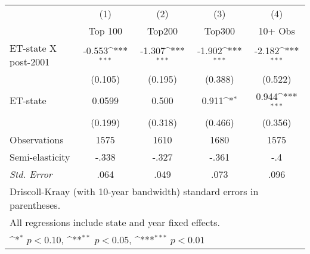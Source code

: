 {
\def\sym#1{\ifmmode^{#1}\else\(^{#1}\)\fi}
\begin{tabular}{l*{4}{c}}
\hline\hline
                &\multicolumn{1}{c}{(1)}&\multicolumn{1}{c}{(2)}&\multicolumn{1}{c}{(3)}&\multicolumn{1}{c}{(4)}\\
                &\multicolumn{1}{c}{Top 100}&\multicolumn{1}{c}{Top200}&\multicolumn{1}{c}{Top300}&\multicolumn{1}{c}{10+ Obs}\\
\hline
ET-state X post-2001&   -0.553\sym{***}&   -1.307\sym{***}&   -1.902\sym{***}&   -2.182\sym{***}\\
                &  (0.105)         &  (0.195)         &  (0.388)         &  (0.522)         \\
[1em]
ET-state        &   0.0599         &    0.500         &    0.911\sym{*}  &    0.944\sym{***}\\
                &  (0.199)         &  (0.318)         &  (0.466)         &  (0.356)         \\
\hline
Observations    &     1575         &     1610         &     1680         &     1575         \\
Semi-elasticity            &    -.338         &    -.327         &    -.361         &      -.4         \\
\quad \textit{Std. Error}          &     .064         &     .049         &     .073         &     .096         \\
\hline \hline
\multicolumn{5}{l}{\footnotesize Driscoll-Kraay (with 10-year bandwidth) standard errors in parentheses.} \\
\multicolumn{5}{l}{\footnotesize All regressions include state and year fixed effects.} \\
\multicolumn{5}{l}{\footnotesize \sym{*} \(p<0.10\), \sym{**} \(p<0.05\), \sym{***} \(p<0.01\)}  \end{tabular} }
